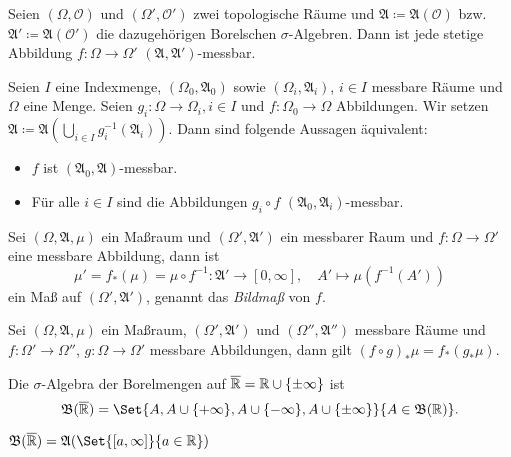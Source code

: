 \documentclass{cheat-sheet}
\newcommand{\Alg}{\mathfrak{A}} %
\newcommand{\Bor}{\mathfrak{B}} %
\begin{document}
\begin{satz}
  Seien $(\Omega, \mathcal{O})$ und $(\Omega', \mathcal{O}')$ zwei topologische Räume und $\Alg \coloneqq \Alg(\mathcal{O})$ bzw. $\Alg' \coloneqq \Alg(\mathcal{O}')$ die dazugehörigen Borelschen $\sigma$-Algebren. Dann ist jede stetige Abbildung $f : \Omega \to \Omega'$ $(\Alg, \Alg')$-messbar.
\end{satz}


\begin{satz}[Projektionssatz]
  Seien $I$ eine Indexmenge, $(\Omega_0, \Alg_0)$ sowie $(\Omega_i, \Alg_i)$, $i \in I$ messbare Räume und $\Omega$ eine Menge. Seien $g_i : \Omega \to \Omega_i, i \in I$ und $f : \Omega_0 \to \Omega$ Abbildungen. Wir setzen $\Alg \coloneqq \Alg\left( \bigcup_{i \in I} g_i^{-1}(\Alg_i) \right)$. Dann sind folgende Aussagen äquivalent:
  \begin{itemize}
    \item $f$ ist $(\Alg_0, \Alg)$-messbar.
    \item Für alle $i \in I$ sind die Abbildungen $g_i \circ f$ $(\Alg_0, \Alg_i)$-messbar.
  \end{itemize}
\end{satz}

\begin{satz}
  Sei $(\Omega, \Alg, \mu)$ ein Maßraum und $(\Omega', \Alg')$ ein messbarer Raum und $f : \Omega \to \Omega'$ eine messbare Abbildung, dann ist
  \[ \mu' = f_*(\mu) = \mu \circ f^{-1} : \Alg' \to [0, \infty], \quad A' \mapsto \mu(f^{-1}(A')) \]
  ein Maß auf $(\Omega', \Alg')$, genannt das \emph{Bildmaß} von $f$.
\end{satz}

\begin{bem}
  Sei $(\Omega, \Alg, \mu)$ ein Maßraum, $(\Omega', \Alg')$ und $(\Omega'', \Alg'')$ messbare Räume und $f : \Omega' \to \Omega''$, $g : \Omega \to \Omega'$ messbare Abbildungen, dann gilt $(f \circ g)_* \mu = f_*(g_* \mu)$.
\end{bem}

\begin{defn}
  Die $\sigma$-Algebra der Borelmengen auf $\overline{\mathbb{R}} = \mathbb{R} \cup \{ \pm \infty \}$ ist
  \[ \Bor(\ER) = \Set{ A, A \cup \{ +\infty \}, A \cup \{ -\infty \}, A \cup \{ \pm \infty \} }{ A \in \Bor(\R) }. \]
\end{defn}

\begin{satz}
  $\Bor(\ER) = \Alg(\Set{ [a, \infty] }{ a \in \R })$
\end{satz}
\end{document}
